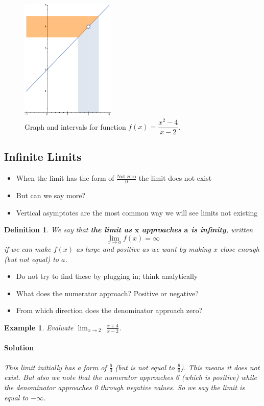 \documentclass[letterpaper, 11pt, openany]{book}
\theoremstyle{mytheoremstyle}
\newtheorem{definition}{Definition}[section]
\theoremstyle{myexamplestyle}
\newtheorem{example}{Example}[section]
\newenvironment{solution}{\paragraph{\sffamily \smaller \fontseries{b}\selectfont Solution}}{\hfill\faSquare}
\begin{document}
\begin{figure}[htbp]
    \centering
        \includegraphics[width=0.4\textwidth]{Figures/deflimitplot.pdf}
    \caption{Graph and intervals for function $f(x) = \dfrac{x^{2} - 4}{x - 2}$.}
    \label{f:deflimitplot}
\end{figure}

\subsection{Infinite Limits}
\setcounter{figure}{0}

\begin{itemize}
    \item When the limit has the form of $\frac{\text{Not zero}}{0}$ the limit does not exist
    \item But can we say more?
    \item Vertical asymptotes are the most common way we will see limits not existing
\end{itemize}
\begin{definition}\label{d:infinite-limit}
    We say that \textbf{the limit as $\bm{x}$ approaches $\bm{a}$ is infinity}, written
    \[
        \lim_{x\to a} f(x) = \infty
    \]    
    if we can make $f(x)$ as large and positive as we want by making $x$ close enough (but not equal) to $a$.
\end{definition}
\begin{itemize}
    \item Do not try to find these by plugging in; think analytically
    \item What does the numerator approach? Positive or negative?
    \item From which direction does the denominator approach zero?
\end{itemize}

\begin{example}\label{e:inf-limit-one-side}
    Evaluate $\displaystyle \lim_{x \to 2^{-}} \frac{x+4}{x-2}$.
    \begin{solution}
        This limit initially has a form of $\frac{6}{0}$ (\emph{but is not equal to} $\frac{6}{0}$). This means it does not exist. But also we note that the numerator approaches 6 (which is positive) while the denominator approaches 0 through negative values. So we say the limit is equal to $-\infty$.
    \end{solution}
\end{example}
\end{document}

